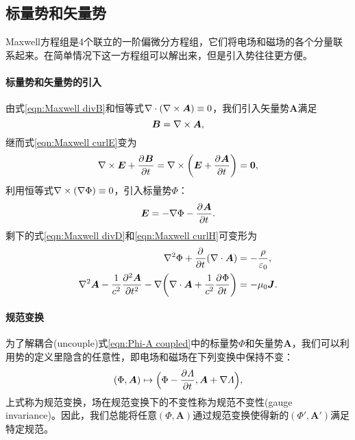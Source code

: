 \subsection{标量势和矢量势}

Maxwell方程组是4个联立的一阶偏微分方程组，它们将电场和磁场的各个分量联系起来。在简单情况下这一方程组可以解出来，但是引入势往往更方便。

\paragraph{标量势和矢量势的引入}

由式\eqref{eqn:Maxwell divB}和恒等式$\nabla\cdot(\nabla\times\bm A)\equiv 0$，我们引入矢量势$\bm A$满足 
\begin{equation}
    \label{eqn:curlA}
    \bm B=\curl\bm A,
\end{equation}
继而式\eqref{eqn:Maxwell curlE}变为 
\[
    \nabla\times\bm E+\frac{\partial^{{}}\bm B}{\partial{t}^{{}}}=\nabla\times\biggl(\bm E+\frac{\partial^{{}}\bm A}{\partial{t}^{{}}}\biggr)=\bm 0,
\]
利用恒等式$\nabla\times(\nabla\Phi)\equiv 0$，引入标量势$\Phi$：
\begin{equation}
    \label{eqn:-nablaPhi-pApt}
    \bm E=-\nabla\Phi-\pv{\bm A}t.
\end{equation}
剩下的式\eqref{eqn:Maxwell divD}和\eqref{eqn:Maxwell curlH}可变形为%
\begin{subequations}
    \label{eqn:Phi-A coupled}
    \begin{align}
        \label{eqn:Phi-A coupled a}
        \lapla\Phi+\pp t(\div\bm A)&=-\frac\rho{\varepsilon_0},\\
        \label{eqn:Phi-A coupled b}
        \lapla\bm A-\frac1{c^2}\pv[2]{\bm A}t-\nabla\biggkh{\div\bm A+\frac1{c^2}\pv\Phi t}&=-\mu_0\bm J.
    \end{align}
\end{subequations}

\paragraph{规范变换}

为了解耦合(uncouple)式\eqref{eqn:Phi-A coupled}中的标量势$\Phi$和矢量势$\bm A$，我们可以利用势的定义里隐含的任意性，即电场和磁场在下列变换中保持不变：
\begin{equation}
    (\Phi,\bm A)\mapsto\Bigl(\Phi-\frac{\partial^{{}}\varLambda}{\partial{t}^{{}}},\bm A+\nabla\varLambda\Bigr),
\end{equation}
上式称为规范变换，场在规范变换下的不变性称为规范不变性(gauge invariance)。因此，我们总能将任意$(\Phi,\bm A)$通过规范变换使得新的$(\Phi',\bm A')$满足特定规范。
